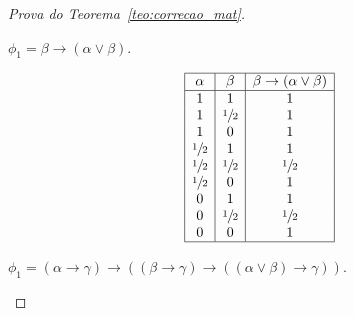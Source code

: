 \begin{proof}[Prova do Teorema~\ref{teo:correcao_mat}]
\begin{provaporcasos}
\begin{provaporsubcasos}
                    \subcasodeprova{} $\phi_{1} = \beta \to (\alpha \lor \beta)$.

                    \begin{center}
                        \[
                            \begin{array}{|c|c|c|}%
                                \hline%
                                \alpha      & \beta & \beta \to (\alpha \lor \beta) \\
                                \hline%
                                1 & 1 &1\\
                                1 & \meio{} &1\\
                                1 & 0 &1\\
                                \meio{} & 1 &1\\
                                \meio{} & \meio{} &\meio{}\\
                                \meio{} & 0 &1\\
                                0 & 1 &1\\
                                0 & \meio{} &\meio{}\\
                                0 & 0 &1\\
                                \hline%
                            \end{array}
                        \]
                    \end{center}

                    \subcasodeprova{} $\phi_{1} = (\alpha \to \gamma) \to ((\beta \to \gamma) \to ((\alpha \lor \beta) \to \gamma))$. 


\end{provaporsubcasos}
\end{provaporcasos}
\end{proof}
